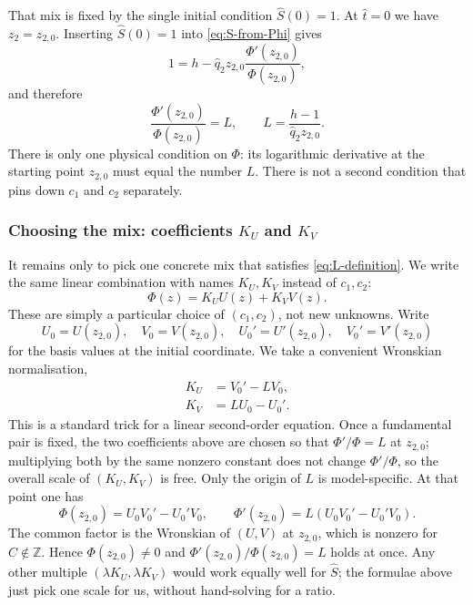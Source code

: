 That mix is fixed by the single initial condition $\widehat S(0)=1$. At $\hat t=0$ we have $z_2=z_{2,0}$. Inserting $\widehat S(0)=1$ into \cref{eq:S-from-Phi} gives
\[
1=h-\hat q_2z_{2,0}\frac{\Phi'(z_{2,0})}{\Phi(z_{2,0})},
\]
and therefore
\begin{equation}
\label{eq:L-definition}
\frac{\Phi'(z_{2,0})}{\Phi(z_{2,0})}
=L,
\qquad
L=\frac{h-1}{\hat q_2z_{2,0}}.
\end{equation}
There is only one physical condition on $\Phi$: its logarithmic derivative at the starting point $z_{2,0}$ must equal the number $L$. There is not a second condition that pins down $c_1$ and $c_2$ separately.

\subsubsection{Choosing the mix: coefficients $K_U$ and $K_V$}

It remains only to pick one concrete mix that satisfies \cref{eq:L-definition}. We write the same linear combination with names $K_U,K_V$ instead of $c_1,c_2$:
\begin{equation}
\label{eq:Phi-linear-combination}
\Phi(z)=K_U U(z)+K_V V(z).
\end{equation}
These are simply a particular choice of $(c_1,c_2)$, not new unknowns. Write
\begin{equation*}
U_0=U(z_{2,0}),
\quad
V_0=V(z_{2,0}),
\quad
U_0'=U'(z_{2,0}),
\quad
V_0'=V'(z_{2,0})
\end{equation*}
for the basis values at the initial coordinate. We take a convenient Wronskian normalisation,
\begin{subequations}
\label{eq:K-coefficients}
\begin{align}
K_U&=V_0'-L V_0,\\
K_V&=L U_0-U_0'.
\end{align}
\end{subequations}
This is a standard trick for a linear second-order equation. Once a fundamental pair is fixed, the two coefficients above are chosen so that $\Phi'/\Phi=L$ at $z_{2,0}$; multiplying both by the same nonzero constant does not change $\Phi'/\Phi$, so the overall scale of $(K_U,K_V)$ is free. Only the origin of $L$ is model-specific. At that point one has
\begin{equation*}
\Phi(z_{2,0})=U_0V_0'-U_0'V_0,
\qquad
\Phi'(z_{2,0})=L(U_0V_0'-U_0'V_0).
\end{equation*}
The common factor is the Wronskian of $(U,V)$ at $z_{2,0}$, which is nonzero for $C\notin\mathbb Z$. Hence $\Phi(z_{2,0})\neq0$ and $\Phi'(z_{2,0})/\Phi(z_{2,0})=L$ holds at once. Any other multiple $(\lambda K_U,\lambda K_V)$ would work equally well for $\widehat S$; the formulae above just pick one scale for us, without hand-solving for a ratio.

